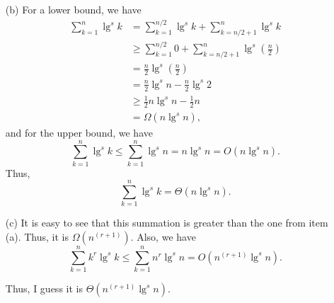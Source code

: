 \begin{enumerate}
\begin{framed}
\begin{enumerate}
\item[(b)] For a lower bound, we have
\begin{equation*}
\begin{aligned}
  \sum_{k = 1}^{n} \lg^{s} k &=   \sum_{k = 1}^{n/2} \lg^{s} k + \sum_{k = n/2 + 1}^{n} \lg^{s} k\\
                             &\ge \sum_{k = 1}^{n/2} 0 + \sum_{k = n/2 + 1}^{n} \lg^{s}{\left(\frac{n}{2}\right)}\\
                             &=   \frac{n}{2} \lg^{s}{\left(\frac{n}{2}\right)}\\
                             &=   \frac{n}{2} \lg^{s}{n} - \frac{n}{2} \lg^{s}{2}\\
                             &\ge \frac{1}{2} n \lg^{s} n - \frac{1}{2} n\\
                             &=   \Omega(n \lg^s n),
\end{aligned}
\end{equation*}
and for the upper bound, we have
\[
  \sum_{k = 1}^{n} \lg^{s} k \le \sum_{k = 1}^{n} \lg^{s} n = n \lg^s n = O(n \lg^s n).
\]
Thus,
\[
  \sum_{k = 1}^{n} \lg^{s} k = \Theta(n \lg^s n).
\]

\item[(c)] It is easy to see that this summation is greater than the one from
item (a). Thus, it is $\Omega(n^{(r + 1)})$. Also, we have
\[
  \sum_{k = 1}^{n} k^r \lg^{s} k \le \sum_{k = 1}^{n} n^r \lg^{s} n = O(n^{(r + 1)} \lg^s n).
\]

Thus, I guess it is $\Theta(n^{(r + 1)} \lg^s n)$.

\end{enumerate}
\end{framed}

\end{enumerate}
